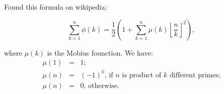\documentclass{article}
\begin{document}
Found this formula on wikipedia:

$$\sum_{k=1}^n\phi(k)=\frac{1}{2}\left(1 + \sum_{k=1}^n\mu(k)\left\lfloor\frac{n}{k}\right\rfloor^2\right),$$

where $\mu(k)$ is the Mobius founction. We have:
\begin{eqnarray*}
\mu(1) &=& 1; \\
\mu(n) &=& (-1) ^ k \text{, if $n$ is product of $k$ different primes;}\\
\mu(n) &=& 0  \text{, otherwise.}
\end{eqnarray*}
\end{document}
